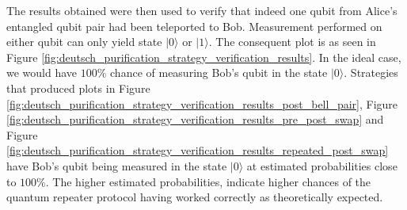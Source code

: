 \documentclass[11pt]{article}
\begin{document}
The results obtained were then used to verify that indeed one qubit from Alice's entangled qubit pair had been teleported to Bob. Measurement performed on either qubit can only yield state $|0\rangle$ or $|1\rangle$. The consequent plot is as seen in Figure \ref{fig:deutsch_purification_strategy_verification_results}. In the ideal case, we would have $100\%$ chance of measuring Bob's qubit in the state $|0\rangle$. Strategies that produced plots in Figure \ref{fig:deutsch_purification_strategy_verification_results_post_bell_pair}, Figure \ref{fig:deutsch_purification_strategy_verification_results_pre_post_swap} and Figure \ref{fig:deutsch_purification_strategy_verification_results_repeated_post_swap} have Bob's qubit being measured in the state $|0\rangle$ at estimated probabilities close to $100\%$. The higher estimated probabilities, indicate higher chances of the quantum repeater protocol having worked correctly as theoretically expected.
\end{document}
